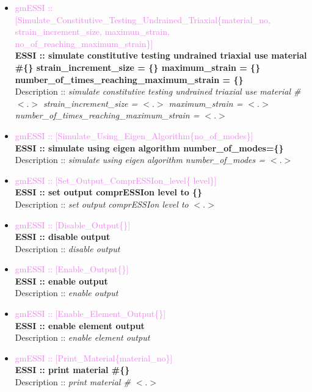 \documentclass[11pt]{article}
\begin{document}
\begin{itemize}
      \item \textcolor{violet} {gmESSI :: [Simulate\_Constitutive\_Testing\_Undrained\_Triaxial\{material\_no, strain\_increment\_size, maximun\_strain, no\_of\_reaching\_maximum\_strain\}]}\\
      \textbf{ESSI :: simulate constitutive testing undrained triaxial use material \#\{\} strain\_increment\_size = \{\} maximum\_strain = \{\} number\_of\_times\_reaching\_maximum\_strain = \{\}}\\
      Description :: \textit{simulate constitutive testing undrained triaxial use material \# $<.>$ strain\_increment\_size = $<.>$ maximum\_strain = $<.>$ number\_of\_times\_reaching\_maximum\_strain  = $<.>$}

      \item \textcolor{violet} {gmESSI :: [Simulate\_Using\_Eigen\_Algorithm\{no\_of\_modes\}]}\\
      \textbf{ESSI :: simulate using eigen algorithm number\_of\_modes=\{\}}\\
      Description :: \textit{simulate using eigen algorithm number\_of\_modes = $<.>$}

      \item \textcolor{violet} {gmESSI :: [Set\_Output\_ComprESSIon\_level\{ level\}]}\\
      \textbf{ESSI :: set output comprESSIon level to \{\}}\\
      Description :: \textit{set output comprESSIon level to $<.>$}

      \item \textcolor{violet} {gmESSI :: [Disable\_Output\{\}]}\\
      \textbf{ESSI :: disable output}\\
      Description :: \textit{disable output}

      \item \textcolor{violet} {gmESSI :: [Enable\_Output\{\}]}\\
      \textbf{ESSI :: enable output}\\
      Description :: \textit{enable output}

      \item \textcolor{violet} {gmESSI :: [Enable\_Element\_Output\{\}]}\\
      \textbf{ESSI :: enable element output}\\
      Description :: \textit{enable element output}

      \item \textcolor{violet} {gmESSI :: [Print\_Material\{material\_no\}]}\\
      \textbf{ESSI :: print material \#\{\}}\\
      Description :: \textit{print material \# $<.>$}


\end{itemize}
\end{document}
